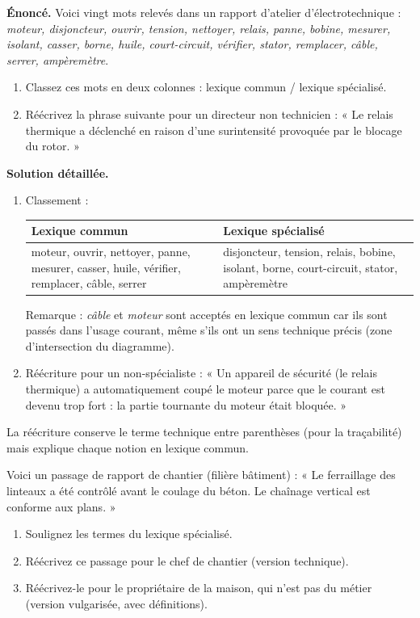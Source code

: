 \documentclass[11pt]{article}
\newcounter{popsec}
\newcounter{popsub}
\newcommand{\courssub}[1]{%
  \stepcounter{popsub}%
  \par\vspace{9pt}\noindent{\popxbold\fontsize{11.5}{13}\selectfont\color{popink}{\color{poporange}\thepopsec.\thepopsub}\hspace{6pt}#1}\par\nopagebreak\vspace{4pt}
}
\begin{document}
\courssub{Exercice résolu : classer et réécrire}

\begin{exoresolu}
\textbf{Énoncé.} Voici vingt mots relevés dans un rapport d'atelier d'électrotechnique : \emph{moteur, disjoncteur, ouvrir, tension, nettoyer, relais, panne, bobine, mesurer, isolant, casser, borne, huile, court-circuit, vérifier, stator, remplacer, câble, serrer, ampèremètre}.
\begin{enumerate}
\item Classez ces mots en deux colonnes : lexique commun / lexique spécialisé.
\item Réécrivez la phrase suivante pour un directeur non technicien : « Le relais thermique a déclenché en raison d'une surintensité provoquée par le blocage du rotor. »
\end{enumerate}
\tcblower
\textbf{Solution détaillée.}
\begin{enumerate}
\item Classement :
\begin{center}
\begin{tabularx}{\linewidth}{|X|X|}\hline
\rowcolor{popblueL} \textbf{Lexique commun} & \textbf{Lexique spécialisé} \\ \hline
moteur, ouvrir, nettoyer, panne, mesurer, casser, huile, vérifier, remplacer, câble, serrer & disjoncteur, tension, relais, bobine, isolant, borne, court-circuit, stator, ampèremètre \\ \hline
\end{tabularx}
\end{center}
Remarque : \emph{câble} et \emph{moteur} sont acceptés en lexique commun car ils sont passés dans l'usage courant, même s'ils ont un sens technique précis (zone d'intersection du diagramme).
\item Réécriture pour un non-spécialiste : « Un appareil de sécurité (le relais thermique) a automatiquement coupé le moteur parce que le courant est devenu trop fort : la partie tournante du moteur était bloquée. »
\end{enumerate}
La réécriture conserve le terme technique entre parenthèses (pour la traçabilité) mais explique chaque notion en lexique commun.
\end{exoresolu}

\begin{exercice}
Voici un passage de rapport de chantier (filière bâtiment) : « Le ferraillage des linteaux a été contrôlé avant le coulage du béton. Le chaînage vertical est conforme aux plans. »
\begin{enumerate}
\item Soulignez les termes du lexique spécialisé.
\item Réécrivez ce passage pour le chef de chantier (version technique).
\item Réécrivez-le pour le propriétaire de la maison, qui n'est pas du métier (version vulgarisée, avec définitions).
\end{enumerate}
\end{exercice}
\end{document}
